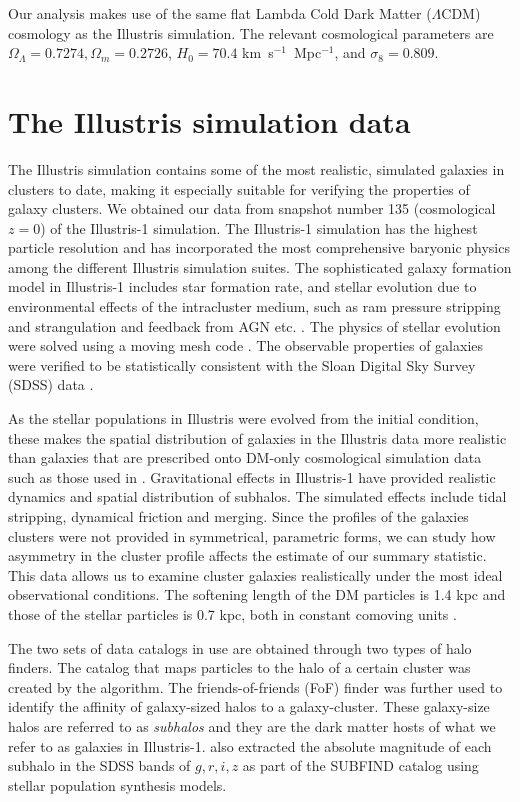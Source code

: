 	Our analysis makes use of the same flat Lambda Cold Dark Matter ($\Lambda$CDM) cosmology
as the Illustris simulation. The relevant cosmological parameters are
$\Omega_\Lambda = 0.7274, \Omega_m = 0.2726$, $H_0 = 70.4$
km~s$^{-1}$~Mpc$^{-1}$, and $\sigma_8 = 0.809$.

\section{The Illustris simulation data} 
\label{sec:illustris_sim}
The Illustris simulation contains some of the most
realistic, simulated galaxies in clusters to date, making it especially suitable for 
verifying the properties of galaxy clusters. We obtained our data from 
snapshot number 135 (cosmological $z=0$) of the Illustris-1 simulation. The Illustris-1
simulation has the highest particle resolution and has incorporated the most 
comprehensive baryonic physics among the different Illustris simulation suites. 
The sophisticated galaxy formation model in Illustris-1 
includes star formation rate, and stellar evolution due to
environmental effects of the intracluster medium, such as ram pressure stripping and
strangulation and feedback from AGN etc. \citep{Genel2014a}.
The physics of stellar
evolution were solved using a moving mesh code {} \citep{Springel2010}.
The observable properties of galaxies were verified to be statistically consistent
with the Sloan Digital Sky Survey (SDSS) data
\citep{Vogelsberger2014}. 

As the stellar populations in Illustris were evolved from the initial condition,
these makes the spatial distribution of galaxies in the Illustris data more 
realistic than galaxies that are prescribed onto DM-only cosmological
simulation data such as those used in \cite{Harvey2013d}.  
Gravitational effects in Illustris-1 have provided realistic dynamics and
spatial distribution of subhalos. The simulated effects include
tidal stripping, dynamical friction and merging. 
Since the profiles of the galaxies clusters were not
provided in symmetrical, parametric forms, we can study 
how asymmetry in the cluster profile affects the estimate of our summary 
statistic. This data allows us to examine cluster galaxies
realistically under the most ideal observational conditions. 
The softening length of the DM particles is
1.4 kpc and those of the stellar particles is 
0.7 kpc, both in constant comoving units \citep{Genel2014a}.

The two sets of data catalogs in use are obtained through two types of halo
finders. The catalog that maps particles to the halo of a certain cluster was 
created by the {} algorithm. The friends-of-friends (FoF) 
finder \citep{Davis1985} was further used to identify the affinity
of galaxy-sized halos to a galaxy-cluster. 
These galaxy-size halos are referred to as {\it subhalos} and 
they are the dark matter hosts of what we refer to as galaxies in Illustris-1. 
\cite{Vogelsberger2014a} also extracted the 
absolute magnitude of each subhalo in
the SDSS bands of $g, r, i, z$ as part of the {\sc
SUBFIND} catalog using stellar population synthesis models.

